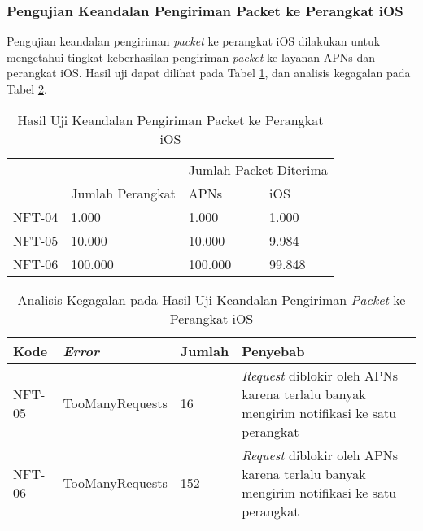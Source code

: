\subsubsection{Pengujian Keandalan Pengiriman Packet ke Perangkat iOS}
\par Pengujian keandalan pengiriman \textit{packet} ke perangkat iOS dilakukan untuk mengetahui tingkat keberhasilan pengiriman \textit{packet} ke layanan APNs dan perangkat iOS. Hasil uji dapat dilihat pada Tabel \ref{t:keandalan_ios}, dan analisis kegagalan pada Tabel \ref{t:analisis_ios}.
\begin{longtable}{|p{1.3cm}|p{3cm}|p{2cm}|p{2cm}|}
	\caption{Hasil Uji Keandalan Pengiriman Packet ke Perangkat iOS} \label{t:keandalan_ios} \\ \hline
	\rowcolor{lightgray} &  & \multicolumn{2}{c|}{Jumlah Packet Diterima} \\ \hhline{~|~|*2{-}|}
	\rowcolor{lightgray} \multirow{-2}{*}{Kode} & \multirow{-2}{*}{Jumlah Perangkat} & APNs & iOS \\ \hline
	NFT-04 & 1.000 & 1.000 & 1.000 \\ \hline
	NFT-05 & 10.000 & 10.000 & 9.984 \\ \hline
	NFT-06 & 100.000 & 100.000 & 99.848 \\ \hline
\end{longtable}
\begin{longtable}{|p{1.3cm}|p{3cm}|p{1cm}|p{3cm}|}
	\caption{Analisis Kegagalan pada Hasil Uji Keandalan Pengiriman \textit{Packet} ke Perangkat iOS} \label{t:analisis_ios} \\ \hline
	\rowcolor{lightgray} Kode & \textit{Error} & Jumlah & Penyebab \\ \hline
	NFT-05 & TooManyRequests & 16 & \textit{Request} diblokir oleh APNs karena terlalu banyak mengirim notifikasi ke satu perangkat \\ \hline
	NFT-06 & TooManyRequests & 152 & \textit{Request} diblokir oleh APNs karena terlalu banyak mengirim notifikasi ke satu perangkat \\ \hline
\end{longtable}

